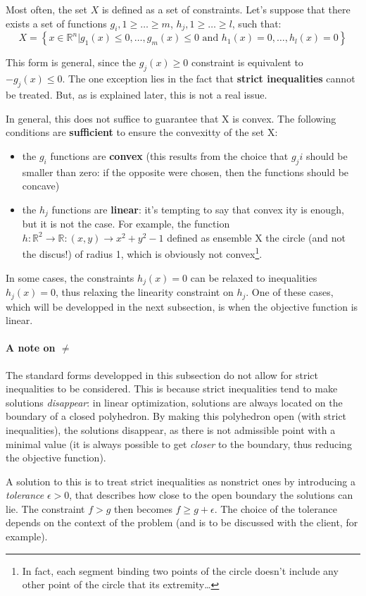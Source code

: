\documentclass[a4paper]{article}
\begin{document}
Most often, the set $X$ is defined as a set of constraints. Let's suppose that there exists a set of functions $g_i, 1 \geq \dots \geq m$, $h_j, 1 \geq \dots \geq l$, such that:
$$X = \left\{ x \in \mathbb{R}^n | g_1(x) \leq 0, \dots, g_m(x) \leq 0 \text{ and } h_1(x)=0, \dots, h_l(x) = 0 \right\}$$

This form is general, since the $g_j(x) \geq 0$ constraint is equivalent to $-g_j(x) \leq 0$. The one exception lies in the fact that \textbf{strict inequalities} cannot be treated. But, as is explained later, this is not a real issue. 

In general, this does not suffice to guarantee that X is convex. The following conditions are \textbf{sufficient} to ensure the convexitty of the set X:
\begin{itemize}
\item the $g_i$ functions are \textbf{convex} (this results from the choice that $g_ji$ should be smaller than zero: if the opposite were chosen, then the functions should be concave)
\item the $h_j$ functions are \textbf{linear}: it's tempting to say that convex ity is enough, but it is not the case. For example, the function $h:\mathbb{R}^2\rightarrow \mathbb{R}: (x,y) \rightarrow x^2+y^2 -1$ defined as ensemble X the circle (and not the discus!) of radius 1, which is obviously not convex\footnote{In fact, each segment binding two points of the circle doesn't include any other point of the circle that its extremity\dots}.
\end{itemize}

In some cases, the constraints $h_j(x)=0$ can be relaxed to inequalities $h_j(x)=0$, thus relaxing the linearity constraint on $h_j$. One of these cases, which will be developped in the next subsection, is when the objective function is linear.


\begin{framed}
\paragraph{A note on $\neq$} The standard forms developped in this subsection do not allow for strict inequalities to be considered. This is because strict inequalities tend to make solutions \textit{disappear}: in linear optimization, solutions are always located on the boundary of a closed polyhedron. By making this polyhedron open (with strict inequalities), the solutions disappear, as there is not admissible point with a minimal value (it is always possible to get \textit{closer} to the boundary, thus reducing the objective function).

A solution to this is to treat strict inequalities as nonstrict ones by introducing a \textit{tolerance} $\epsilon > 0$, that describes how close to the open boundary the solutions can lie. The constraint $f>g$ then becomes $f \geq g+\epsilon$. The choice of the tolerance depends on the context of the problem (and is to be discussed with the client, for example).
\end{framed}
\end{document}
